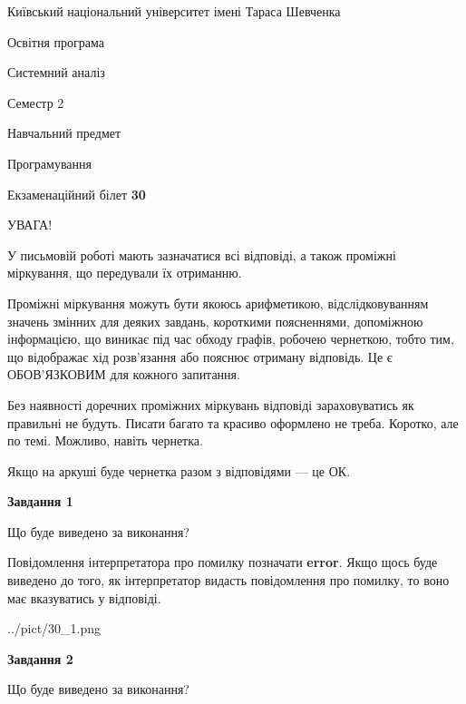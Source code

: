 \documentclass[12pt, ukrainian]{article}
\begin{document}
{{\begin {small}\par
{ \center  Київський національний університет імені Тараса Шевченка \par}
{\parbox {5 cm}{Освітня програма \hfill}{\parbox {7 cm}{Системний аналіз \hfill}}\parbox {6 cm}{\hfill Семестр 2}}\par
{\parbox {5 cm} {Навчальний предмет \hfill}\parbox {7 cm}{Програмування \hfill}\parbox {6cm}{\hfill}\par}\vspace{-7pt} \end{small}}{\center Екзаменаційний білет \No \textbf
{ 30 }\par}}
{
\begin {large}
УВАГА!

У письмовій роботі мають зазначатися всі відповіді, а також проміжні міркування, що передували їх отриманню.

Проміжні міркування можуть бути якоюсь арифметикою, відслідковуванням зна\-чень змінних для деяких завдань,
короткими поясненнями, допоміжною інформацією, що виникає під час обходу графів, робочею чернеткою,
тобто тим, що відображає хід розв’язання або пояснює отриману відповідь.
Це є ОБОВ’ЯЗКОВИМ для кожного запитання.

Без наявності доречних проміжних міркувань відповіді зараховуватись як правиль\-ні не будуть.
Писати багато та красиво оформлено не треба. Коротко, але по темі. Можли\-во, навіть чернетка.

Якщо на аркуші буде чернетка разом з відповідями --- це ОК.

\newpage

{\begin {center}\textbf{Завдання 1}\end {center}}\par
Що буде виведено за виконання?

Повідомлення інтерпретатора про помилку позначати \textbf{error}.
Якщо щось буде виведено до того, як інтерпретатор видасть повідомлення про помилку, 
то воно має вказуватись у відповіді. \par


\begin{center}
	{../pict/30_1.png}
\end{center}
\newpage

{\begin {center}\textbf{Завдання 2}\end {center}}\par
Що буде виведено за виконання?


\end{large}}
\end{document}
